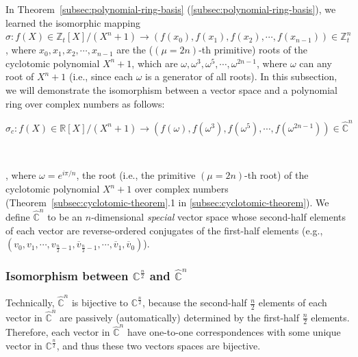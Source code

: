 In Theorem~\ref*{subsec:polynomial-ring-basis} (\autoref{subsec:polynomial-ring-basis}), we learned the isomorphic mapping $\sigma: f(X) \in \mathbb{Z}_t[X]/(X^n + 1) \longrightarrow (f(x_0),f(x_1),f(x_2), \cdots, f(x_{n-1})) \in \mathbb{Z}_t^n$, where $x_0, x_1, x_2, \cdots, x_{n-1}$ are the ($(\mu=2n)$-th primitive) roots of the cyclotomic polynomial $X^n + 1$, which are $\omega, \omega^3, \omega^5, \cdots, \omega^{2n-1}$, where $\omega$ can any root of $X^n + 1$ (i.e., since each $\omega$ is a generator of all roots). In this subsection, we will demonstrate the isomorphism between a vector space and a polynomial ring over complex numbers as follows: 

$\sigma_c: f(X) \in \mathbb{R}[X]/(X^n + 1) \longrightarrow (f(\omega),f(\omega^3),f(\omega^5), \cdots, f(\omega^{2n-1})) \in \mathbb{\hat{C}}^{n}$

$ $

, where $\omega = e^{i\pi/n}$, the root (i.e., the primitive $(\mu=2n)$-th root) of the cyclotomic polynomial $X^n + 1$ over complex numbers (Theorem~\ref*{subsec:cyclotomic-theorem}.1 in \autoref{subsec:cyclotomic-theorem}). We define $\mathbb{\hat{C}}^{n}$ to be an $n$-dimensional \textit{special} vector space whose second-half elements of each vector are reverse-ordered conjugates of the first-half elements (e.g., $(v_0, v_1, \cdots, v_{\frac{n}{2}-1}, \overline{v}_{\frac{n}{2}-1}, \cdots, \overline{v}_1, \overline{v}_0 )$). 

\subsubsection{Isomorphism between $\mathbb{C}^{\frac{n}{2}}$ and $\mathbb{\hat C}^{n}$}
\label{subsec:poly-vector-transformation-complex-isomorphism1}


 Technically, $\mathbb{\hat{C}}^{n}$ is bijective to $\mathbb{C}^{\frac{n}{2}}$, because the second-half $\frac{n}{2}$ elements of each vector in $\mathbb{{\hat C}}^{n}$ are passively (automatically) determined by the first-half $\frac{n}{2}$ elements. Therefore, each vector in $\mathbb{\hat{C}}^{n}$ have one-to-one correspondences with some unique vector in $\mathbb{{C}}^{\frac{n}{2}}$, and thus these two vectors spaces are bijective. 

